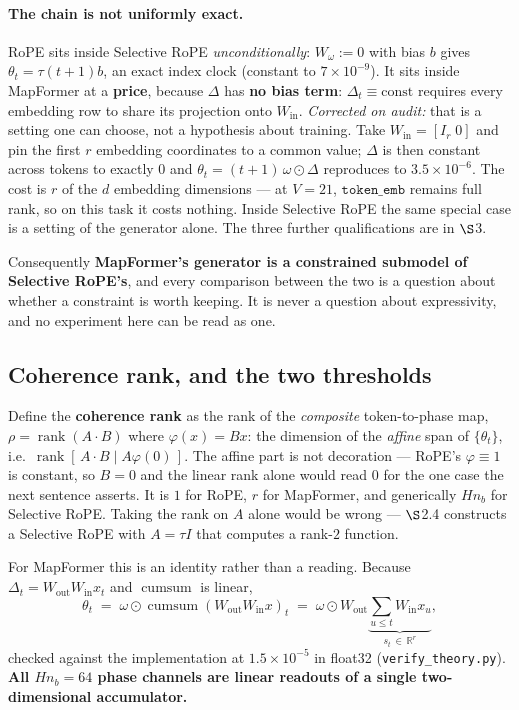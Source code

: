 \documentclass[11pt]{article}
\newcommand{\R}{\mathbb{R}}
\newcommand{\nb}{n_b}
\DeclareMathOperator*{\cumsum}{cumsum}
\begin{document}
\paragraph{The chain is not uniformly exact.} RoPE sits inside Selective RoPE
\emph{unconditionally}: $W_\omega := 0$ with bias $b$ gives $\theta_t = \tau(t{+}1)b$,
an exact index clock (constant to $7\times10^{-9}$). It sits inside MapFormer at a
\textbf{price}, because $\Delta$ has \textbf{no bias term}: $\Delta_t \equiv
\text{const}$ requires every embedding row to share its projection onto
$W_{\mathrm{in}}$. \emph{Corrected on audit:} that is a setting one can choose, not
a hypothesis about training. Take $W_{\mathrm{in}} = [I_r\;0]$ and pin the first
$r$ embedding coordinates to a common value; $\Delta$ is then constant across
tokens to exactly $0$ and $\theta_t = (t{+}1)\,\omega\odot\Delta$ reproduces to
$3.5\times10^{-6}$. The cost is $r$ of the $d$ embedding dimensions --- at $V=21$,
$\texttt{token\_emb}$ remains full rank, so on this task it costs nothing. Inside
Selective RoPE the same special case is a setting of the generator alone. The three further qualifications
are in $\S$3.

\medskip
\noindent Consequently \textbf{MapFormer's generator is a constrained submodel of
Selective RoPE's}, and every comparison between the two is a question about
whether a constraint is worth keeping. It is never a question about expressivity,
and no experiment here can be read as one.

\subsection{Coherence rank, and the two thresholds}
\label{sec:rank}

Define the \textbf{coherence rank} as the rank of the \emph{composite}
token-to-phase map, $\rho = \operatorname{rank}(A\!\cdot\!B)$ where
$\varphi(x) = Bx$: the dimension of the \emph{affine} span of $\{\theta_t\}$, i.e.\
$\operatorname{rank}[\,A\!\cdot\!B \mid A\varphi(0)\,]$. The affine part is not
decoration --- RoPE's $\varphi\equiv1$ is constant, so $B=0$ and the linear rank
alone would read $0$ for the one case the next sentence asserts. It is $1$ for
RoPE, $r$ for MapFormer, and
generically $H\nb$ for Selective RoPE. Taking the rank on $A$ alone would be
wrong --- $\S$2.4 constructs a Selective RoPE with $A = \tau I$ that computes a
rank-$2$ function.

For MapFormer this is an identity rather than a reading. Because
$\Delta_t = W_{\mathrm{out}}W_{\mathrm{in}}x_t$ and $\cumsum$ is linear,
\begin{equation}
  \label{eq:factor}
  \theta_t
  \;=\;\omega\odot\cumsum\!\left(W_{\mathrm{out}}W_{\mathrm{in}}x\right)_t
  \;=\;\omega\odot W_{\mathrm{out}}
       \underbrace{\sum_{u\le t} W_{\mathrm{in}}x_u}_{\textstyle s_t\,\in\,\R^{r}},
\end{equation}
checked against the implementation at $1.5\times10^{-5}$ in float32 (\texttt{verify\_theory.py}). \textbf{All $H\nb = 64$
phase channels are linear readouts of a single two-dimensional accumulator.}
\end{document}
